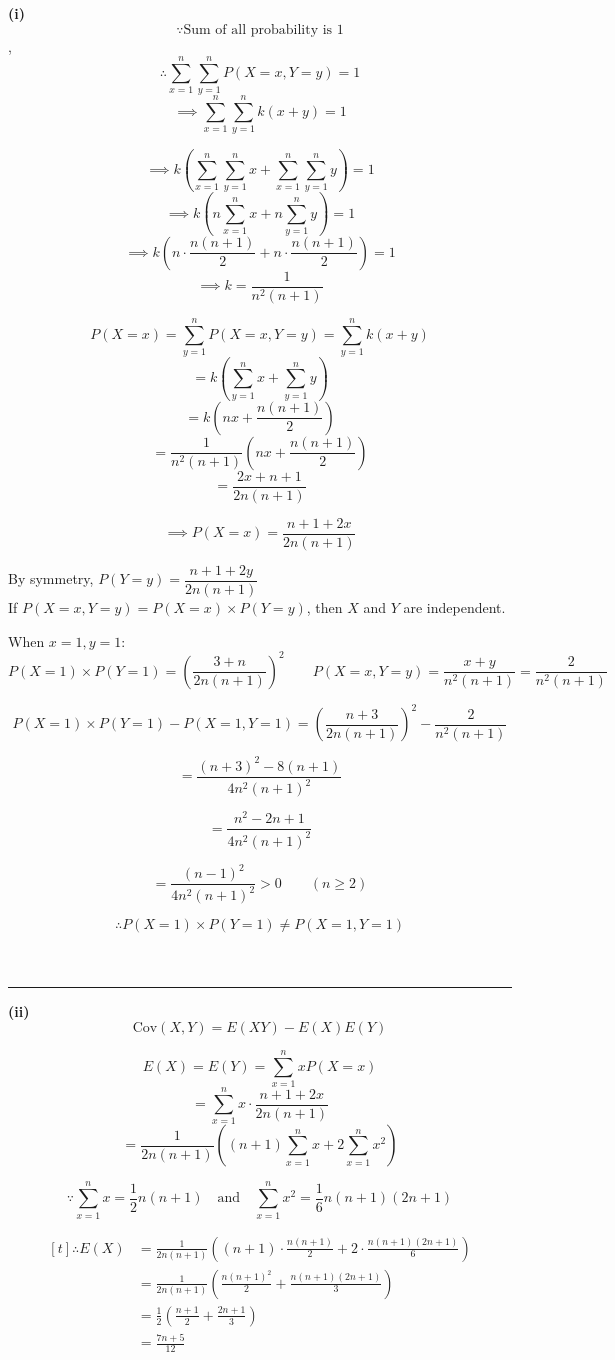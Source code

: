 ﻿\documentclass[12pt]{article}
\begin{document}
\textbf{(i)}
$$\because \text{Sum of all probability is }1$$,
$$\therefore \sum_{x=1}^n \sum_{y=1}^n P(X=x,Y=y)=1$$
$$\implies \sum_{x=1}^n \sum_{y=1}^n k(x+y)=1$$

$$\implies k\left(\sum_{x=1}^n \sum_{y=1}^n x+\sum_{x=1}^n \sum_{y=1}^n y\right)=1$$
$$\implies k\left(n\sum_{x=1}^n x+n\sum_{y=1}^n y\right)=1$$
$$\implies k\left(n\cdot \frac{n(n+1)}{2}+n\cdot \frac{n(n+1)}{2}\right)=1$$
$$\implies \boxed{k=\frac{1}{n^2(n+1)}}$$



$$P(X=x)=\sum_{y=1}^n P(X=x,Y=y)=\sum_{y=1}^n k(x+y)$$
$$=k\left(\sum_{y=1}^n x+\sum_{y=1}^n y\right)$$
$$=k\left(nx+\frac{n(n+1)}{2}\right)$$
$$=\frac{1}{n^2(n+1)}\left(nx+\frac{n(n+1)}{2}\right)$$
$$=\frac{2x+n+1}{2n(n+1)}$$

$$\implies \boxed{P(X=x)=\frac{n+1+2x}{2n(n+1)}}$$

By symmetry, $P(Y=y)=\dfrac{n+1+2y}{2n(n+1)}$\\


If $P(X=x,Y=y)=P(X=x)\times P(Y=y)$, then $X$ and $Y$ are independent.

When $x=1, y=1$:
$$P(X=1)\times P(Y=1)=\left( \frac{3+n}{2n(n+1)}\right)^2\qquad P(X=x,Y=y)=\frac{x+y}{n^2(n+1)}=\frac{2}{n^2(n+1)}$$

$$P(X=1)\times P(Y=1)-P(X=1,Y=1)
=\left( \frac{n+3}{2n(n+1)}\right)^2-\frac{2}{n^2(n+1)}$$

$$=\frac{(n+3)^2-8(n+1)}{4n^2(n+1)^2}$$

$$=\frac{n^2-2n+1}{4n^2(n+1)^2}$$

$$=\frac{(n-1)^2}{4n^2(n+1)^2}>0\qquad (n\geq2)$$

$$\therefore P(X=1)\times P(Y=1)\ne P(X=1,Y=1)$$\\\\




\bigskip\hrule\bigskip
\textbf{(ii)} $$\mathrm{Cov}(X,Y)=E(XY)-E(X)E(Y)$$

$$E(X)=E(Y)=\sum_{x=1}^n xP(X=x)$$
$$=\sum_{x=1}^n x\cdot \frac{n+1+2x}{2n(n+1)}$$
$$=\frac{1}{2n(n+1)}\left((n+1)\sum_{x=1}^n x+2\sum_{x=1}^n x^2\right)$$


$$\because \displaystyle\sum_{x=1}^n x=\frac{1}{2}n(n+1) \quad \text{and} \quad
\sum_{x=1}^n x^2=\frac{1}{6}n(n+1)(2n+1)$$


\[
\begin{aligned}[t]
\therefore E(X)&=\frac{1}{2n(n+1)}\left((n+1)\cdot \frac{n(n+1)}{2}+2\cdot \frac{n(n+1)(2n+1)}{6}\right)\\
&=\frac{1}{2n(n+1)}\left(\frac{n(n+1)^2}{2}+\frac{n(n+1)(2n+1)}{3}\right)\\
&=\frac{1}{2}\left(\frac{n+1}{2}+\frac{2n+1}{3}\right)\\
&=\frac{7n+5}{12}
\end{aligned}
\]
\end{document}
